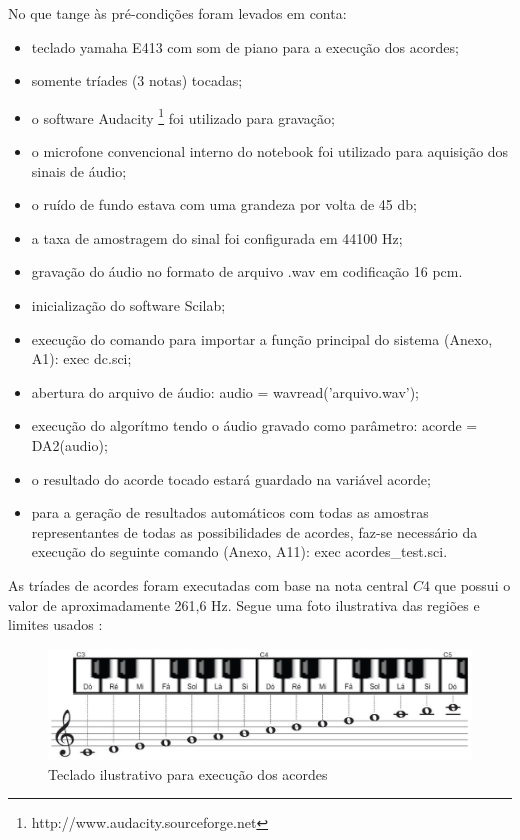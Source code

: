 No que tange às pré-condições foram levados em conta:
\begin{itemize}
    \item teclado yamaha E413 com som de piano para a execução dos acordes;
    \item somente tríades (3 notas) tocadas;
    \item o software Audacity \footnote{http://www.audacity.sourceforge.net} foi utilizado para gravação;
    \item o microfone convencional interno do notebook foi utilizado para aquisição dos sinais de áudio;
    \item o ruído de fundo estava com uma grandeza por volta de 45 db;
    \item a taxa de amostragem do sinal foi configurada em 44100 Hz;
    \item gravação do áudio no formato de arquivo .wav em codificação 16 pcm.
    \item inicialização do software Scilab;
    \item execução do comando para importar a função principal do sistema (Anexo, A1): exec dc.sci;
    \item abertura do arquivo de áudio: audio = wavread('arquivo.wav');
    \item execução do algorítmo tendo o áudio gravado como parâmetro: acorde = DA2(audio);
    \item o resultado do acorde tocado estará guardado na variável acorde;
    \item para a geração de resultados automáticos com todas as amostras representantes de todas as possibilidades de acordes, faz-se necessário da execução do seguinte comando (Anexo, A11): exec acordes{\_}test.sci.
\end{itemize}

\newpage
As tríades de acordes foram executadas com base na nota central $C4$ que possui o valor de aproximadamente 261,6 Hz. Segue uma foto ilustrativa das regiões e limites usados \cite{teclado}:

\begin{figure}[h]
	\centering
		\includegraphics[keepaspectratio=true,scale=0.4]{figuras/teclado-tcc1.eps}
	\caption{Teclado ilustrativo para execução dos acordes}
\end{figure}

